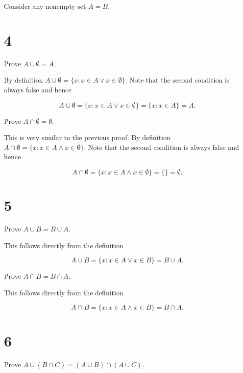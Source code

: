 \documentclass[a4paper]{article}
\begin{document}
Consider any nonempty set $A = B$.


\section*{4}

Prove $A \cup \emptyset = A$.

\vspace{\baselineskip}

By definition $A \cup \emptyset = \{ x : x \in A \lor x \in \emptyset \}$. Note that the second condition is always false and hence

$$A \cup \emptyset = \{ x : x \in A \lor x \in \emptyset \} = \{ x : x \in A \} = A.$$

Prove $A \cap \emptyset = \emptyset$.

\vspace{\baselineskip}

This is very similar to the previous proof. By definition $A \cap \emptyset = \{ x : x \in A \land x \in \emptyset \}$. Note that the second condition is always false and hence

$$A \cap \emptyset = \{ x : x \in A \land x \in \emptyset \} = \{ \} = \emptyset.$$


\section*{5}

Prove $A \cup B = B \cup A$.

\vspace{\baselineskip}

This follows directly from the definition

$$A \cup B = \{x : x \in A \lor x \in B\} = B \cup A.$$

Prove $A \cap B = B \cap A$.

\vspace{\baselineskip}

This follows directly from the definition

$$A \cap B = \{x : x \in A \land x \in B\} = B \cap A.$$


\section*{6}

Prove $A \cup (B \cap C) = (A \cup B) \cap (A \cup C)$.

\vspace{\baselineskip}
\end{document}
